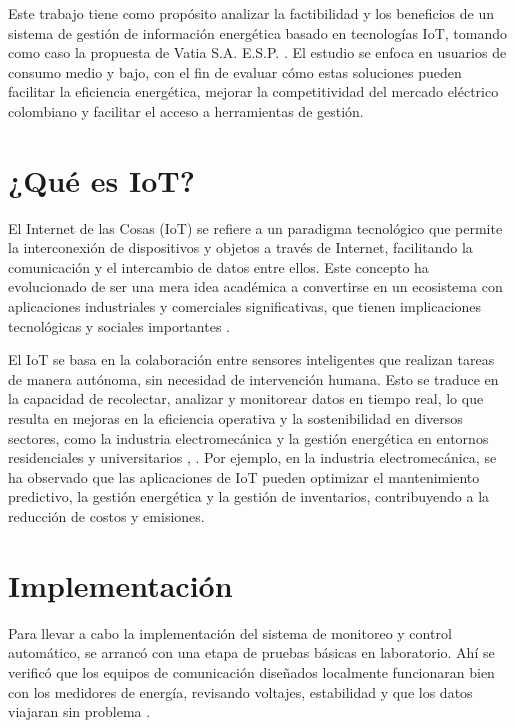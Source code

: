 Este trabajo tiene como propósito analizar la factibilidad y los beneficios de un sistema de gestión de información energética basado en tecnologías IoT, tomando como caso la propuesta de Vatia S.A. E.S.P. \cite{Jaramillo2022}. El estudio se enfoca en usuarios de consumo medio y bajo, con el fin de evaluar cómo estas soluciones pueden facilitar la eficiencia energética, mejorar la competitividad del mercado eléctrico colombiano y facilitar el acceso a herramientas de gestión.



\section{¿Qué es IoT?}
El Internet de las Cosas (IoT) se refiere a un paradigma tecnológico que permite la interconexión de dispositivos y objetos a través de Internet, facilitando la comunicación y el intercambio de datos entre ellos. Este concepto ha evolucionado de ser una mera idea académica a convertirse en un ecosistema con aplicaciones industriales y comerciales significativas, que tienen implicaciones tecnológicas y sociales importantes \cite{MoralesTamayoYoandrys2025AdId}.

El IoT se basa en la colaboración entre sensores inteligentes que realizan tareas de manera autónoma, sin necesidad de intervención humana. Esto se traduce en la capacidad de recolectar, analizar y monitorear datos en tiempo real, lo que resulta en mejoras en la eficiencia operativa y la sostenibilidad en diversos sectores, como la industria electromecánica y la gestión energética en entornos residenciales y universitarios \cite{OlivaresGorritiEneko2022Eydd}, \cite{RomeroMacíasJavierVidal2025Adid}.
Por ejemplo, en la industria electromecánica, se ha observado que las aplicaciones de IoT pueden optimizar el mantenimiento predictivo, la gestión energética y la gestión de inventarios, contribuyendo a la reducción de costos y emisiones.


\section{Implementación}
Para llevar a cabo la implementación del sistema de monitoreo y control automático, se arrancó con una etapa de pruebas básicas en laboratorio. Ahí se verificó que los equipos de comunicación diseñados localmente funcionaran bien con los medidores de energía, revisando voltajes, estabilidad y que los datos viajaran sin problema \cite{Jaramillo2022}.


